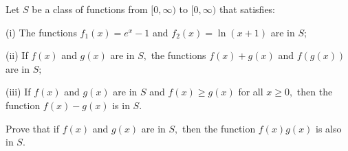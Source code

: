 Let $S$ be a class of functions from $[0,\infty)$ to $[0,\infty)$ that satisfies:

(i) The functions $f_1(x)=e^x-1$ and $f_2(x)=\ln(x+1)$ are in $S;$

(ii) If $f(x)$ and $g(x)$ are in $S,$ the functions $f(x)+g(x)$ and $f(g(x))$ are in $S;$

(iii) If $f(x)$ and $g(x)$ are in $S$ and $f(x)\ge g(x)$ for all $x\ge 0,$ then the function $f(x)-g(x)$ is in $S.$

Prove that if $f(x)$ and $g(x)$ are in $S,$ then the function $f(x)g(x)$ is also in $S.$